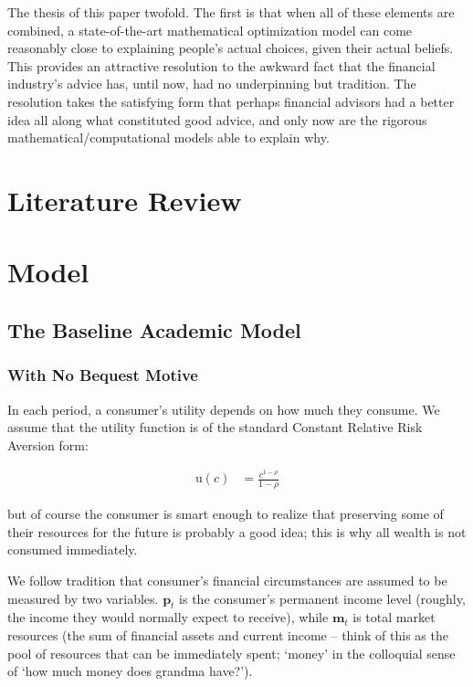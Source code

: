 \documentclass{article}
\newcommand{\CRRA}{\rho}
\newcommand{\uFunc}{\mathrm{u}}
\newcommand{\pLvl}{\mathbf{p}}
\newcommand{\mLvl}{\mathbf{m}}
\begin{document}
The thesis of this paper twofold. The first is that when all of these elements are combined, a state-of-the-art mathematical optimization model can come reasonably close to explaining people's actual choices, given their actual beliefs. This provides an attractive resolution to the awkward fact that the financial industry's advice has, until now, had no underpinning but tradition. The resolution takes the satisfying form that perhaps financial advisors had a better idea all along what constituted good advice, and only now are the rigorous mathematical/computational models able to explain why.

\section{Literature Review}

\cite{Acharya_2020}

\cite{Dynan_2002}

\section{Model}

\subsection{The Baseline Academic Model}

\subsubsection{With No Bequest Motive}

In each period, a consumer's utility depends on how much they consume. We assume that the utility function is of the standard Constant Relative Risk Aversion form:

\begin{equation}
\begin{align}
    \uFunc(c) & = \frac{c^{1-\CRRA}}{1-\CRRA}
\end{align}
\end{equation}

but of course the consumer is smart enough to realize that preserving some of their resources for the future is probably a good idea; this is why all wealth is not consumed immediately.

We follow tradition that consumer's financial circumstances are assumed to be measured by two variables. $\pLvl_{t}$ is the consumer's permanent income level (roughly, the income they would normally expect to receive), while $\mLvl_{t}$ is total market resources (the sum of financial assets and current income -- think of this as the pool of resources that can be immediately spent; `money' in the colloquial sense of `how much money does grandma have?').
\end{document}
